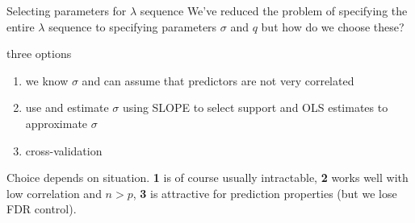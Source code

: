 \documentclass[10pt]{beamer}
\begin{document}
\begin{frame}[fragile]{Selecting parameters for \(\lambda\) sequence}
We've reduced the problem of specifying the entire \(\lambda\) sequence to specifying parameters \(\sigma\) and \(q\) but \alert{how do we choose these?}\medskip

\begin{block}{three options}
\begin{enumerate}
    \item we know \(\sigma\) and can assume that predictors are not very correlated
    \item use \autocite[Algorithm 5]{bogdan2015} and estimate \(\sigma\) using SLOPE to select support and OLS estimates to approximate \(\sigma\)
    \item cross-validation
\end{enumerate}
Choice depends on situation. \textbf{1} is of course usually intractable, \textbf{2} works well with low correlation and \(n > p\), \textbf{3} is attractive for prediction properties (but we lose FDR control).
\end{block}
\end{frame}
\end{document}
